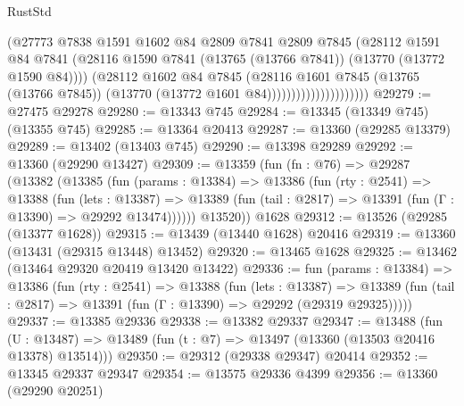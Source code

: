 \begin{lexlean}{RustStd}
\begin{coremodule}
                                    (@27773
                                      @7838
                                      @1591
                                      @1602
                                      @84
                                      @2809
                                      @7841
                                      @2809
                                      @7845
                                      (@28112
                                        @1591
                                        @84
                                        @7841
                                        (@28116
                                          @1590
                                          @7841
                                          (@13765 (@13766 @7841))
                                          (@13770 (@13772 @1590 @84))))
                                      (@28112
                                        @1602
                                        @84
                                        @7845
                                        (@28116
                                          @1601
                                          @7845
                                          (@13765 (@13766 @7845))
                                          (@13770 (@13772 @1601 @84)))))))))))))))))))))
@29279 := @27475 @29278
@29280 := @13343 @745
@29284 := @13345 (@13349 @745) (@13355 @745)
@29285 := @13364 @20413
@29287 := @13360 (@29285 @13379)
@29289 := @13402 (@13403 @745)
@29290 := @13398 @29289
@29292 := @13360 (@29290 @13427)
@29309 := @13359
    (fun (fn : @76) =>
    @29287
      (@13382
        (@13385
          (fun (params : @13384) =>
          @13386
            (fun (rty : @2541) =>
            @13388
              (fun (lets : @13387) =>
              @13389 (fun (tail : @2817) => @13391 (fun (Γ : @13390) => @29292 @13474))))))
        @13520))
    @1628
@29312 := @13526 (@29285 (@13377 @1628))
@29315 := @13439 (@13440 @1628) @20416
@29319 := @13360 (@13431 (@29315 @13448) @13452)
@29320 := @13465 @1628
@29325 := @13462 (@13464 @29320 @20419 @13420 @13422)
@29336 := fun (params : @13384) =>
  @13386
    (fun (rty : @2541) =>
    @13388
      (fun (lets : @13387) =>
      @13389 (fun (tail : @2817) => @13391 (fun (Γ : @13390) => @29292 (@29319 @29325)))))
@29337 := @13385 @29336
@29338 := @13382 @29337
@29347 := @13488
    (fun (U : @13487) => @13489 (fun (t : @7) => @13497 (@13360 (@13503 @20416 @13378) @13514)))
@29350 := @29312 (@29338 @29347) @20414
@29352 := @13345 @29337 @29347
@29354 := @13575 @29336 @4399
@29356 := @13360 (@29290 @20251)

\end{coremodule}
\end{lexlean}
